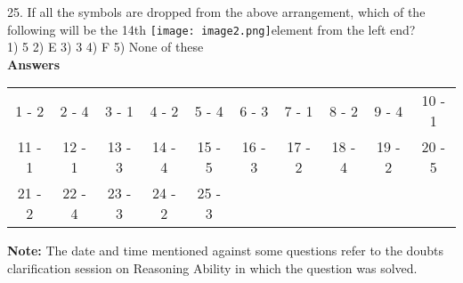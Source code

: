\documentclass[
]{article}
\begin{document}
25. If all the symbols are dropped from the above arrangement, which of the following will be the 14th \texttt{[image: image2.png]}element from the left end?\\
1) 5 \hspace{2mm}2) E \hspace{2mm}3) 3 \hspace{2mm}4) F \hspace{2mm}5) None of these\\

\textbf{Answers}\\
\begin{tabular}{c c c c c c c c c c}
1 - 2 &2 - 4 &3 - 1 &4 - 2 &5 - 4 &6 - 3 &7 - 1 &8 - 2 &9 - 4 &10 - 1\\
11 - 1 &12 - 1 &13 - 3 &14 - 4 &15 - 5 &16 - 3 &17 - 2 &18 - 4 &19 - 2 &20 - 5\\
21 - 2 &22 - 4 &23 - 3 &24 - 2 &25 - 3\\
\end{tabular}

\textbf{Note:} The date and time mentioned against some questions refer to the doubts clarification
session on Reasoning Ability in which the question was solved.\\
\end{document}
